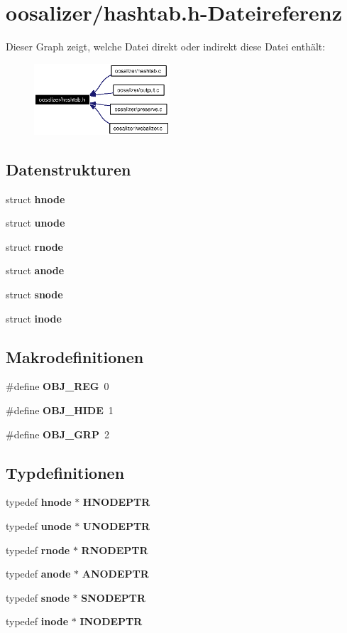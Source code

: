 \section{oosalizer/hashtab.h-Dateireferenz}
\label{hashtab_8h}


Dieser Graph zeigt, welche Datei direkt oder indirekt diese Datei enth\"{a}lt:\begin{figure}[H]
\begin{center}
\leavevmode
\includegraphics[width=143pt]{hashtab_8h__dep__incl}
\end{center}
\end{figure}
\subsection*{Datenstrukturen}
\begin{CompactItemize}
\item 
struct {\bf hnode}
\item 
struct {\bf unode}
\item 
struct {\bf rnode}
\item 
struct {\bf anode}
\item 
struct {\bf snode}
\item 
struct {\bf inode}
\end{CompactItemize}
\subsection*{Makrodefinitionen}
\begin{CompactItemize}
\item 
\#define {\bf OBJ\_\-REG}~0
\item 
\#define {\bf OBJ\_\-HIDE}~1
\item 
\#define {\bf OBJ\_\-GRP}~2
\end{CompactItemize}
\subsection*{Typdefinitionen}
\begin{CompactItemize}
\item 
typedef {\bf hnode} $\ast$ {\bf HNODEPTR}
\item 
typedef {\bf unode} $\ast$ {\bf UNODEPTR}
\item 
typedef {\bf rnode} $\ast$ {\bf RNODEPTR}
\item 
typedef {\bf anode} $\ast$ {\bf ANODEPTR}
\item 
typedef {\bf snode} $\ast$ {\bf SNODEPTR}
\item 
typedef {\bf inode} $\ast$ {\bf INODEPTR}
\end{CompactItemize}
